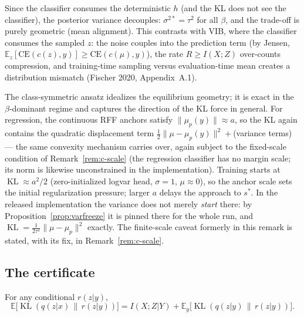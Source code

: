 \begin{remark}
Since the classifier consumes the deterministic $h$ (and the KL does not see the
classifier), the posterior variance decouples: $\sigma^{2*} = \tau^2$ for all $\beta$, and
the trade-off is purely geometric (mean alignment). This contrasts with VIB, where the
classifier consumes the sampled $z$: the noise couples into the prediction term (by
Jensen, $\mathbb{E}_z[\mathrm{CE}(c(z),y)] \ge \mathrm{CE}(c(\mu),y)$), the rate
$R \ge I(X;Z)$ over-counts compression, and training-time sampling versus
evaluation-time mean creates a distribution mismatch (Fischer 2020, Appendix~A.1).
\end{remark}

\begin{remark}[Idealizations]\label{rem:caveats}
The class-symmetric ansatz idealizes the equilibrium geometry; it is exact in the
$\beta$-dominant regime and captures the direction of the KL force in general. For
regression, the continuous RFF anchors satisfy $\|\mu_p(y)\| \approx a$, so the KL again
contains the quadratic displacement term
$\tfrac{1}{2}\|\mu - \mu_p(y)\|^2 + {}$(variance terms) --- the same convexity mechanism
carries over, again subject to the fixed-scale condition of Remark~\ref{rem:c-scale}
(the regression classifier has no margin scale; its norm is likewise unconstrained in
the implementation). Training starts at $\operatorname{KL} \approx a^2/2$
(zero-initialized logvar head, $\sigma = 1$, $\mu \approx 0$), so the anchor scale sets
the initial regularization pressure; larger $a$ delays the approach to $s^*$. In the
released implementation the variance does not merely \emph{start} there: by
Proposition~\ref{prop:varfreeze} it is pinned there for the whole run, and
$\operatorname{KL} = \tfrac{1}{2\tau^2}\|\mu - \mu_p\|^2$ exactly. The
finite-scale caveat formerly in this remark is stated, with its fix, in
Remark~\ref{rem:c-scale}.
\end{remark}

\subsection{The certificate}

\begin{lemma}\label{lem:gap}
For any conditional $r(z|y)$,
\begin{equation}
\mathbb{E}\big[\operatorname{KL}(q(z|x)\,\|\,r(z|y))\big]
= I(X;Z|Y) + \mathbb{E}_y\big[\operatorname{KL}(q(z|y)\,\|\,r(z|y))\big] .
\label{eq:gap}
\end{equation}
\end{lemma}

